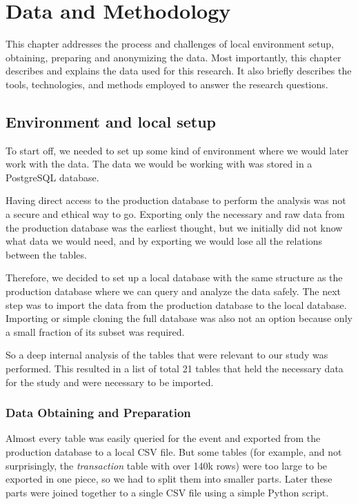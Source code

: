 \chapter{Data and Methodology}
\label{ch:data-methodology}
This chapter addresses the process and challenges of local environment setup, obtaining, preparing and anonymizing the data.
Most importantly, this chapter describes and explains the data used for this research.
It also briefly describes the tools, technologies, and methods employed to answer the research questions.


\section{Environment and local setup}
\label{sec:data-methodology-environment}

To start off, we needed to set up some kind of environment where we would later work with the data.
The data we would be working with was stored in a PostgreSQL database.

Having direct access to the production database to perform the analysis was not a secure and ethical way to go.
Exporting only the necessary and raw data from the production database was the earliest thought, but we initially did not know what data we would need, and by exporting we would lose all the relations between the tables.

Therefore, we decided to set up a local database with the same structure as the production database where we can query and analyze the data safely.
The next step was to import the data from the production database to the local database.
Importing or simple cloning the full database was also not an option because only a small fraction of its subset was required.

So a deep internal analysis of the tables that were relevant to our study was performed.
This resulted in a list of total 21 tables that held the necessary data for the study and were necessary to be imported.

\subsection{Data Obtaining and Preparation}
\label{subsec:data-methodology-obtaining-preparation}

Almost every table was easily queried for the event and exported from the production database to a local CSV file.
But some tables (for example, and not surprisingly, the \textit{transaction} table with over 140k rows) were too large to be exported in one piece, so we had to split them into smaller parts.
Later these parts were joined together to a single CSV file using a simple Python script.

